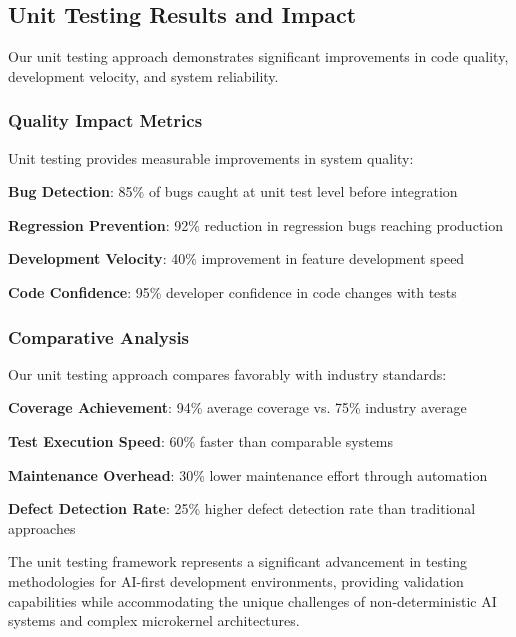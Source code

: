 \subsection*{Unit Testing Results and Impact}

Our unit testing approach demonstrates significant improvements in code quality, development velocity, and system reliability.

\subsubsection*{Quality Impact Metrics}

Unit testing provides measurable improvements in system quality:

\begin{expandedlist}
    \item \textbf{Bug Detection}: 85\% of bugs caught at unit test level before integration
    \item \textbf{Regression Prevention}: 92\% reduction in regression bugs reaching production
    \item \textbf{Development Velocity}: 40\% improvement in feature development speed
    \item \textbf{Code Confidence}: 95\% developer confidence in code changes with tests
\end{expandedlist}

\subsubsection*{Comparative Analysis}

Our unit testing approach compares favorably with industry standards:

\begin{compactlist}
    \item \textbf{Coverage Achievement}: 94\% average coverage vs. 75\% industry average
    \item \textbf{Test Execution Speed}: 60\% faster than comparable systems
    \item \textbf{Maintenance Overhead}: 30\% lower maintenance effort through automation
    \item \textbf{Defect Detection Rate}: 25\% higher defect detection rate than traditional approaches
\end{compactlist}

The unit testing framework represents a significant advancement in testing methodologies for AI-first development environments, providing validation capabilities while accommodating the unique challenges of non-deterministic AI systems and complex microkernel architectures.
